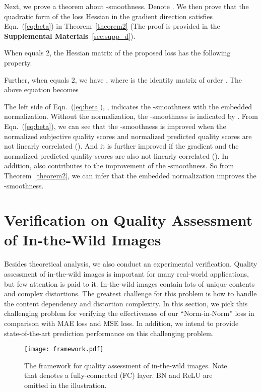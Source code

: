 \documentclass[sigconf]{acmart}
\begin{document}
Next, we prove a theorem about -smoothness. 
Denote . 
We then prove that the quadratic form of the loss Hessian in the gradient direction satisfies Eqn.~(\ref{eq:beta}) in Theorem~\ref{theorem2} (The proof is provided in the \textbf{Supplemental Materials}~\ref{sec:supp_d}). 

\begin{theorem}[-smoothness]\label{theorem2}
When  equals 2, the Hessian matrix of the proposed loss  has the following property.


Further, when  equals 2, we have , where  is the identity matrix of order . 
The above equation becomes


\end{theorem}

The left side of Eqn.~(\ref{eq:beta}), , indicates the -smoothness with the embedded normalization. 
Without the normalization, the -smoothness is indicated by . 
From Eqn.~(\ref{eq:beta}), we can see that the -smoothness is improved when the normalized subjective quality scores  and normalized predicted quality scores  are not linearly correlated (). 
And it is further improved if the gradient  and the normalized predicted quality scores  are also not linearly correlated (). 
In addition,  also contributes to the improvement of the -smoothness. 
So from Theorem~\ref{theorem2}, we can infer that the embedded normalization improves the -smoothness.

\section{Verification on Quality Assessment of In-the-Wild Images}
\label{sec:verification}
Besides theoretical analysis, we also conduct an experimental verification.
Quality assessment of in-the-wild images is important for many real-world applications, but few attention is paid to it.
In-the-wild images contain lots of unique contents and complex distortions.
The greatest challenge for this problem is how to handle the content dependency and distortion complexity.
In this section, we pick this challenging problem for verifying the effectiveness of our ``Norm-in-Norm'' loss in comparison with MAE loss and MSE loss. 
In addition, we intend to provide state-of-the-art prediction performance on this challenging problem.

\begin{figure}[!t]
    \centering
    \texttt{[image: framework.pdf]}
    \caption{The framework for quality assessment of in-the-wild images. Note that  denotes a fully-connected (FC) layer. BN and ReLU are omitted in the illustration.}
    \label{fig:framework}
\end{figure}
\end{document}
